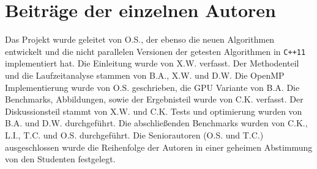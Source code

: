 \documentclass[10pt]{article}
\begin{document}
\section*{Beiträge der einzelnen Autoren}
Das Projekt wurde geleitet von O.S., der ebenso die neuen Algorithmen entwickelt und die nicht parallelen 
Versionen der getesten Algorithmen in {\tt C++11} implementiert hat. Die Einleitung wurde von X.W. verfasst.
Der Methodenteil und die Laufzeitanalyse stammen von B.A., X.W. und D.W. Die OpenMP Implementierung wurde von O.S. geschrieben, 
die GPU Variante von B.A. Die Benchmarks, Abbildungen, sowie der Ergebnisteil wurde von C.K. verfasst. Der Diskussionsteil stammt von 
X.W. und C.K. Tests und optimierung wurden von B.A. und D.W. durchgeführt. Die abschließenden Benchmarks wurden von C.K., L.I., T.C. und O.S.
durchgeführt. \newline
\noindent Die Seniorautoren (O.S. und T.C.) ausgeschlossen wurde die Reihenfolge der Autoren in einer geheimen Abstimmung 
von den Studenten festgelegt. 



\end{document}
